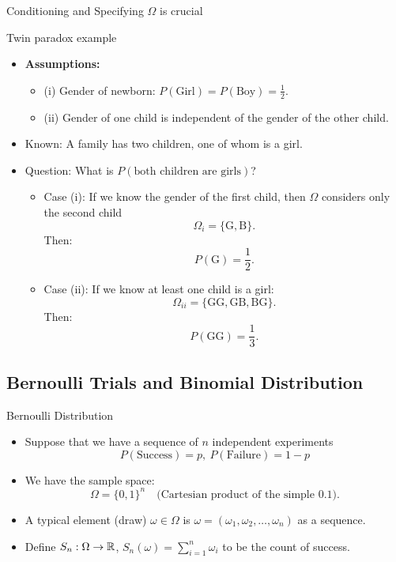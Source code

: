 \begin{rmk}{Conditioning and Specifying $\Omega$ is crucial}

\end{rmk}
\begin{eg}{Twin paradox example}
	\begin{itemize}
    \item \textbf{Assumptions:}
    \begin{itemize}
        \item (i) Gender of newborn: \(P(\text{Girl}) = P(\text{Boy}) = \frac{1}{2}\).
        \item (ii) Gender of one child is independent of the gender of the other child.
    \end{itemize}
    \item Known: A family has two children, one of whom is a girl.  
    \item Question: What is \(P(\text{both children are girls})\)?
    \begin{itemize}
        \item Case (i): If we know the gender of the first child, then $\Omega$ considers only the second child
        \[
        \Omega_i = \{\text{G}, \text{B}\}.
        \]
        Then:
        \[
        P(\text{G}) = \frac{1}{2}.
        \]
        \item Case (ii): If we know at least one child is a girl:  
        \[
        \Omega_{ii} = \{\text{GG}, \text{GB}, \text{BG}\}.
        \]
        Then:
        \[
        P(\text{GG}) = \frac{1}{3}.
        \]
    \end{itemize}
\end{itemize}
\end{eg}

\subsection{Bernoulli Trials and Binomial Distribution}

\begin{eg}{Bernoulli Distribution}
\begin{itemize}
\item Suppose that we have a sequence of \(n\) independent experiments
$$P(\text{Success}) = p,\ P(\text{Failure}) = 1 - p$$
\item We have the sample space: 
	\[
    \Omega = \{0, 1\}^n \quad \text{(Cartesian product of the simple $\qty{0, 1}$)}.
    \]
\item A typical element (draw) \(\omega \in \Omega\) is \(\omega = (\omega_1, \omega_2, \dots, \omega_n)\) as a sequence.
\item Define $S_n: \Omega \rightarrow {\mathbb{R}}$, $S_n(\omega) = \sum_{i=1}^n \omega_i$ to be the count of success. 
\end{itemize}
\end{eg}


